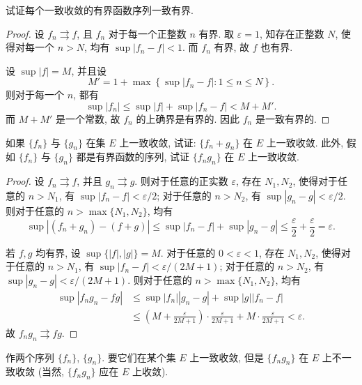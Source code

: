 \documentclass{article}
\begin{document}
\begin{problem}[7-1]
试证每个一致收敛的有界函数序列一致有界.
\end{problem}

\begin{proof}
  设 \( f_n \rightrightarrows f \), 且 \( f_n \) 对于每一个正整数 \( n \) 有界. 取 \( \varepsilon=1 \), 知存在正整数 \( N \), 使得对每一个 \( n>N \), 均有 \( \sup | f_n-f | <1 \). 而 \( f_n \) 有界, 故 \( f \) 也有界.

  设 \( \sup |f| = M \), 并且设 
  \[ M'=1+\max\left\{ \sup |f_n-f| :1\le n\le N \right\}. \]
  则对于每一个 \( n \), 都有
  \[ \sup |f_n| \le \sup |f| + \sup |f_n-f| <M+M'. \]
  而 \( M+M' \) 是一个常数, 故 \( f_n \) 的上确界是有界的. 因此 \( f_n \) 是一致有界的.
\end{proof}



\begin{problem}[7-2]
如果 $\{f_n\}$ 与 $\{g_n\}$ 在集 $E$ 上一致收敛, 试证: $\{f_n + g_n\}$ 在 $E$ 上一致收敛. 此外, 假如 $\{f_n\}$ 与 $\{g_n\}$ 都是有界函数的序列, 试证 $\{f_n g_n\}$ 在 $E$ 上一致收敛.
\end{problem}

\begin{proof}
  设 \( f_n \rightrightarrows f \), 并且 \( g_n \rightrightarrows g \). 则对于任意的正实数 \( \varepsilon \), 存在 \( N_1, N_2 \), 使得对于任意的 \( n>N_1 \), 有 \( \sup |f_n-f| <\varepsilon/2 \); 对于任意的 \( n>N_2 \), 有 \( \sup |g_n-g| <\varepsilon/2 \). 则对于任意的 \( n>\max\{N_1,N_2\} \), 均有
  \[ \sup|(f_n+g_n)-(f+g)| \le \sup |f_n-f| + \sup |g_n-g| \le \frac{\varepsilon}{2} + \frac{\varepsilon}{2} = \varepsilon. \]

  若 \( f, g \) 均有界, 设 \( \sup\{|f|,|g|\}=M \). 对于任意的 \( 0<\varepsilon <1 \), 存在 \( N_1,N_2 \), 使得对于任意的 \( n>N_1 \), 有 \( \sup |f_n-f| <\varepsilon/(2M+1) \); 对于任意的 \( n>N_2 \), 有 \( \sup |g_n-g| <\varepsilon/(2M+1) \). 则对于任意的 \( n>\max\{N_1,N_2\} \), 均有
  \begin{align*}
    \sup|f_n g_n - fg| 
    &\le \sup |f_n||g_n-g| + \sup |g||f_n-f| \\
    &\le \left(M+\frac{\varepsilon}{2M+1} \right)\cdot \frac{\varepsilon}{2M+1} + M\cdot \frac{\varepsilon}{2M+1} <\varepsilon.
  \end{align*}
  故 \( f_ng_n \rightrightarrows fg \). 
\end{proof}



\begin{problem}[7-3]
作两个序列 $\{f_n\}$, $\{g_n\}$. 要它们在某个集 $E$ 上一致收敛, 但是 $\{f_n g_n\}$ 在 $E$ 上不一致收敛 (当然, $\{f_n g_n\}$ 应在 $E$ 上收敛).
\end{problem}
\end{document}
